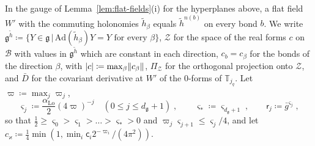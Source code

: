 \documentclass[11pt]{preprint}
\DeclarePairedDelimiter{\abs}{\lvert}{\rvert}
\DeclarePairedDelimiter{\norm}{\lVert}{\rVert}
\numberwithin{equation}{section}
\theoremstyle{definition}
\theoremstyle{remark}
\theoremstyle{plain}
\begin{document}
In the gauge of Lemma~\ref{lem:flat-fields}(i) for the hyperplanes above, a flat field $W'$ with the commuting holonomies $\tilde h_\beta$ equals $\tilde h^{n(b)}$ on every bond $b$. We write $\mathfrak g^{\tilde h} \coloneqq \{ Y \in \mathfrak g \,|\, \mathrm{Ad}(\tilde h_\beta)Y = Y \text{ for every } \beta \}$, $\mathcal Z$ for the space of the real forms $c$ on $\mathcal B$ with values in $\mathfrak g^{\tilde h}$ which are constant in each direction, $c_b = c_\beta$ for the bonds of the direction $\beta$, with $\abs c \coloneqq \max_\beta\norm{c_\beta}$, $\Pi_{\mathcal Z}$ for the orthogonal projection onto $\mathcal Z$, and $\bar D$ for the covariant derivative at $W'$ of the $0$-forms of $\mathbb T_{j_q}$. Let $\varpi \coloneqq \max_j\varpi_j$,
\begin{equation}\label{eq:strata-exponents}
    \varsigma_j \coloneqq \frac{\alpha_{\mathrm{Lo}}}{2}(4\varpi)^{-j}\quad (0 \leq j \leq d_{\mathfrak g} + 1)\;,
    \qquad
    \varsigma_* \coloneqq \varsigma_{d_{\mathfrak g}+1}\;,
    \qquad
    \mathsf r_j \coloneqq \bar g^{\varsigma_j}\;,
\end{equation}
so that $\frac12 \geq \varsigma_0 > \varsigma_1 > \dots > \varsigma_* > 0$ and $\varpi_j\varsigma_{j+1} \leq \varsigma_j/4$, and let $c_\varkappa \coloneqq \frac14\min(1, \min_i\mathsf c_i2^{-\varpi_i}/(4\pi^2))$.
\end{document}
